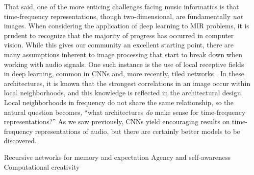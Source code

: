 That said, one of the more enticing challenges facing music informatics is that time-frequency representations, though two-dimensional, are fundamentally \emph{not} images.
When considering the application of deep learning to MIR problems, it is prudent to recognize that the majority of progress has occurred in computer vision.
While this gives our community an excellent starting point, there are many assumptions inherent to image processing that start to break down when working with audio signals.
One such instance is the use of local receptive fields in deep learning, common in CNNs and, more recently, tiled networks \cite{Le2010}.
In these architectures, it is known that the strongest correlations in an image occur within local neighborhoods, and this knowledge is reflected in the architectural design.
Local neighborhoods in frequency do not share the same relationship, so the natural question becomes, ``what architectures \emph{do} make sense for time-frequency representations?''
As we saw previously, CNNs yield encouraging results on time-frequency representations of audio, but there are certainly better models to be discovered.

Recursive networks for memory and expectation
Agency and self-awareness
Computational creativity
